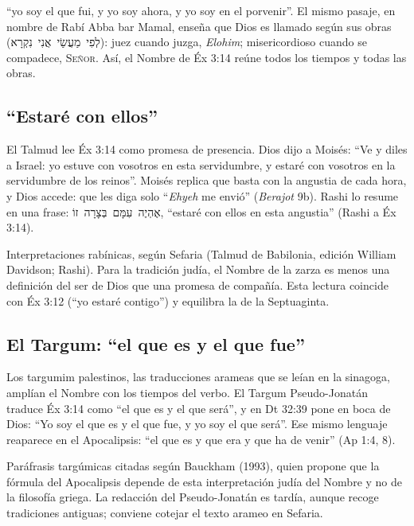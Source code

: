 \documentclass[11pt,letterpaper]{article}
\newcommand{\heb}[1]{\mbox{\foreignlanguage{hebrew}{#1}}}
\newcommand{\SENOR}{\textsc{Señor}}
\begin{document}
``yo soy el que fui, y yo soy ahora, y yo soy en el porvenir''. El mismo pasaje, en nombre de Rabí Abba bar Mamal, enseña que Dios es llamado según sus obras (\heb{לְפִי מַעֲשַׂי אֲנִי נִקְרָא}): juez cuando juzga, \emph{Elohim}; misericordioso cuando se compadece, \SENOR. Así, el Nombre de Éx 3:14 reúne todos los tiempos y todas las obras.

\subsection{``Estaré con ellos''}
El Talmud lee Éx 3:14 como promesa de presencia. Dios dijo a Moisés: ``Ve y diles a Israel: yo estuve con vosotros en esta servidumbre, y estaré con vosotros en la servidumbre de los reinos''. Moisés replica que basta con la angustia de cada hora, y Dios accede: que les diga solo ``\emph{Ehyeh} me envió'' (\emph{Berajot} 9b). Rashi lo resume en una frase: \heb{אֶהְיֶה עִמָּם בְּצָרָה זוֹ}, ``estaré con ellos en esta angustia'' (Rashi a Éx 3:14).

\begin{nota}[Precisión]
Interpretaciones rabínicas, según Sefaria (Talmud de Babilonia, edición William Davidson; Rashi). Para la tradición judía, el Nombre de la zarza es menos una definición del ser de Dios que una promesa de compañía. Esta lectura coincide con Éx 3:12 (``yo estaré contigo'') y equilibra la de la Septuaginta.
\end{nota}

\subsection{El Targum: ``el que es y el que fue''}
Los targumim palestinos, las traducciones arameas que se leían en la sinagoga, amplían el Nombre con los tiempos del verbo. El Targum Pseudo-Jonatán traduce Éx 3:14 como ``el que es y el que será'', y en Dt 32:39 pone en boca de Dios: ``Yo soy el que es y el que fue, y yo soy el que será''. Ese mismo lenguaje reaparece en el Apocalipsis: ``el que es y que era y que ha de venir'' (Ap 1:4, 8).

\begin{nota}[Precisión]
Paráfrasis targúmicas citadas según Bauckham (1993), quien propone que la fórmula del Apocalipsis depende de esta interpretación judía del Nombre y no de la filosofía griega. La redacción del Pseudo-Jonatán es tardía, aunque recoge tradiciones antiguas; conviene cotejar el texto arameo en Sefaria.
\end{nota}
\end{document}

